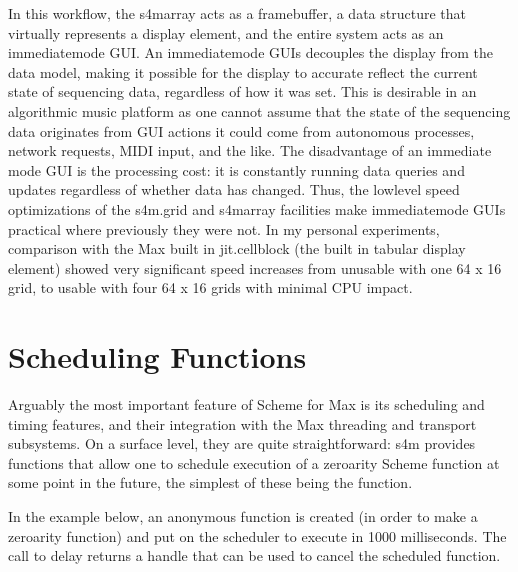 \documentclass[letterpaper,10pt,english]{sphinxmanual}
\begin{document}
\sphinxAtStartPar
In this workflow, the s4m\sphinxhyphen{}array acts as a framebuffer,
a data structure that virtually represents a display element, and
the entire system acts as an immediate\sphinxhyphen{}mode GUI.
An immediate\sphinxhyphen{}mode GUIs decouples the display from the data model,
making it possible for the display to accurate reflect the current
state of sequencing data, regardless of how it was set.
This is desirable in an algorithmic music platform as one cannot
assume that the state of the sequencing data originates from
GUI actions \sphinxhyphen{} it could come from autonomous processes, network
requests, MIDI input, and the like.
The disadvantage of an immediate mode GUI is the processing cost:
it is constantly running data queries and updates regardless of whether
data has changed.
Thus, the low\sphinxhyphen{}level speed optimizations of the s4m.grid and s4m\sphinxhyphen{}array
facilities make immediate\sphinxhyphen{}mode GUIs practical where previously they were not.
In my personal experiments, comparison with the Max built in jit.cellblock
(the built in tabular display element) showed very significant speed
increases \sphinxhyphen{} from unusable with one 64 x 16 grid, to usable with
four 64 x 16 grids with minimal CPU impact.


\section{Scheduling Functions}
\label{\detokenize{features_usage:scheduling-functions}}
\sphinxAtStartPar
Arguably the most important feature of Scheme for Max
is its scheduling and timing features, and their integration
with the Max threading and transport subsystems.
On a surface level, they are quite straightforward: s4m provides
functions that allow one to schedule execution of a zero\sphinxhyphen{}arity Scheme
function at some point in the future, the simplest of these being the
 function.

\sphinxAtStartPar
In the example below, an anonymous function is created (in order to make
a zero\sphinxhyphen{}arity function) and put on the scheduler
to execute in 1000 milliseconds. The call to delay returns a
handle that can be used to cancel the scheduled function.

\begin{sphinxVerbatim}[commandchars=\\\{\}]

\end{sphinxVerbatim}
\end{document}
